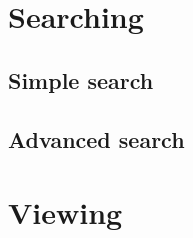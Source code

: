 \documentclass[10pt,a4paper]{article}
\begin{document}


\section{Searching}

\subsection{Simple search}



\subsection{Advanced search}



\section{Viewing}
\end{document}
